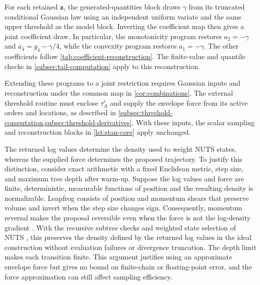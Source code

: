 For each retained $\boldsymbol z$, the generated-quantities block
draws $\gamma$ from its truncated conditional Gaussian law using an
independent uniform variate and the same upper threshold as the model
block. Inverting the coefficient map then gives a joint coefficient
draw. In particular, the monotonicity program restores $a_2=-\gamma$
and $a_4=g_4-\gamma/4$, while the convexity program restores
$a_1=-\gamma$. The other coefficients follow
\cref{tab:coefficient-reconstruction}. The finite-value and quantile
checks in \cref{subsec:tail-computation} apply to this reconstruction.

Extending these programs to a joint restriction requires Gaussian
inputs and reconstruction under the common map in
\cref{cor:combinations}. The external threshold routine must enclose
$\tau_A^\varepsilon$ and supply the envelope force from its active
orders and locations, as described in
\cref{subsec:threshold-computation,subsec:threshold-derivatives}.
With these inputs, the scalar sampling and reconstruction blocks
in \cref{lst:stan-core} apply unchanged.

The returned log values determine the density used to weight NUTS
states, whereas the supplied force determines the proposed trajectory.
To justify this distinction, consider exact arithmetic with a fixed
Euclidean metric, step size, and maximum tree depth after warm-up.
Suppose the log values and force are finite, deterministic, measurable
functions of position and the resulting density is normalizable.
Leapfrog consists of position and momentum shears that preserve volume
and invert when the step size changes sign. Consequently, momentum
reversal makes the proposal reversible even when the force is not the
log-density gradient \citep[Section 5.5]{neal2011hmc}.
With the recursive subtree checks and weighted state selection of
NUTS \citep[Appendices A.3--A.5]{betancourt2017conceptual}, this
preserves the density defined by the returned log values in the ideal
construction without evaluation failures or divergence truncation.
The depth limit makes each transition finite. This argument justifies
using an approximate envelope force but gives no bound on finite-chain
or floating-point error, and the force approximation can still affect
sampling efficiency.
